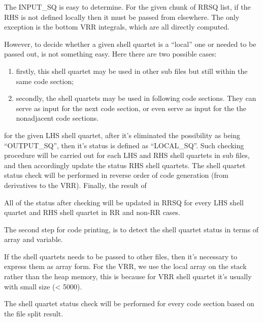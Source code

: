 The INPUT\_SQ is easy to determine. For the given chunk of RRSQ list, if the RHS is not defined
locally then it must be passed from elsewhere. The only exception is the bottom VRR integrals,
which are all directly computed.

However, to decide whether a given shell quartet is a ``local'' one or needed to be passed out,
is not something easy. Here there are two possible cases:
\begin{enumerate}
 \item firstly, this shell quartet may be used in other sub files but still within the same 
 code section;
 \item secondly, the shell quartets may be used in following code sections. They can serve
 as input for the next code section, or even serve as input for the the nonadjacent code 
 sections.
\end{enumerate}
for the given LHS shell quartet, after it's eliminated the possibility as being ``OUTPUT\_SQ'',
then it's status is defined as ``LOCAL\_SQ''. Such checking procedure will be carried out for each 
LHS and RHS shell quartets in sub files, and then accordingly update the status RHS shell quartets.
The shell quartet status check will be performed in reverse order of code generation (from derivatives
to the VRR). Finally, the result of 

All of the status after checking will be updated in RRSQ for every LHS shell quartet and 
RHS shell quartet in RR and non-RR cases.




The second step for code printing, is to detect the shell quartet status in terms 
of array and variable. 

If the shell quartets needs to be passed to other files, then it's necessary to 
express them as array form. For the VRR, we use the local array on the stack 
rather than the heap memory, this is because for VRR shell quartet it's usually
with small size (< 5000).

The shell quartet status check will be performed for every code section based 
on the file split result.